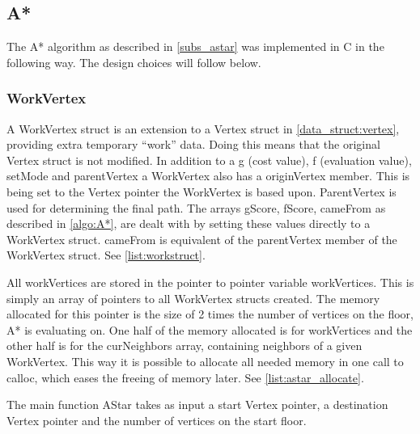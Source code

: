 \subsection{A*}


The A* algorithm as described in \cref{subs_astar} was implemented in C in the following way. The design choices will follow below.

\subsubsection{WorkVertex}



A WorkVertex struct is an extension to a Vertex struct in \cref{data_struct:vertex}, providing extra temporary \enquote{work} data. Doing this means that the original Vertex struct is not modified. In addition to a g (cost value), f (evaluation value), setMode and parentVertex a WorkVertex also has a originVertex member. This is being set to the Vertex pointer the WorkVertex is based upon. ParentVertex is used for  determining the final path. The arrays gScore, fScore, cameFrom as described in \cref{algo:A*}, are dealt with by setting these values directly to a WorkVertex struct. cameFrom is equivalent of the parentVertex member of the WorkVertex struct. See \cref{list:workstruct}.







All workVertices are stored in the pointer to pointer variable workVertices. This is simply an array of pointers to all WorkVertex structs created. The memory allocated for this pointer is the size of 2 times the number of vertices on the floor, A* is evaluating on. One half of the memory allocated is for workVertices and the other half is for the curNeighbors array, containing neighbors of a given WorkVertex.  This way it is possible to allocate all needed memory in one call to calloc, which eases the freeing of memory later. See \cref{list:astar_allocate}.


The main function AStar takes as input a start Vertex pointer, a destination Vertex pointer and the number of vertices on the start floor.

